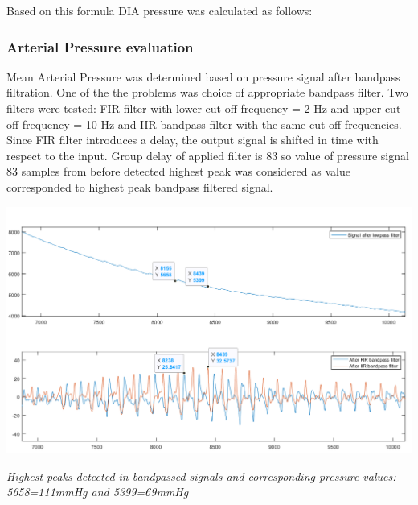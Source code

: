 Based on this formula D\+IA pressure was calculated as follows\+: 
\begin{DoxyCode}{0}
\end{DoxyCode}


\subsubsection*{Arterial Pressure evaluation}

Mean Arterial Pressure was determined based on pressure signal after bandpass filtration. One of the the problems was choice of appropriate bandpass filter. Two filters were tested\+: F\+IR filter with lower cut-\/off frequency = 2 Hz and upper cut-\/off frequency = 10 Hz and I\+IR bandpass filter with the same cut-\/off frequencies. Since F\+IR filter introduces a delay, the output signal is shifted in time with respect to the input. Group delay of applied filter is 83 so value of pressure signal 83 samples from before detected highest peak was considered as value corresponded to highest peak bandpass filtered signal.


\begin{DoxyImage}
\includegraphics[width=\textwidth,height=\textheight/2,keepaspectratio=true]{signalsMAPcalculating.png}
\end{DoxyImage}


{\itshape  Highest peaks detected in bandpassed signals and corresponding pressure values\+: 5658=111mm\+Hg and 5399=69mm\+Hg }~\newline


